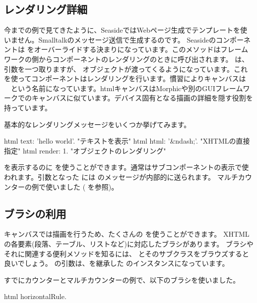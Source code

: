\documentclass[a4paper,10pt,twoside]{book}
\begin{document}
\subsection{レンダリング詳細}

今までの例で見てきたように、SeasideではWebページ生成でテンプレートを使いません。Smalltalkのメッセージ送信で生成するのです。
Seasideのコンポーネントは  をオーバーライドする決まりになっています。このメソッドはフレームワークの側からコンポーネントのレンダリングのときに呼び出されます。
 は、引数を一つ取りますが、  オブジェクトが渡ってくるようになっています。これを使ってコンポーネントはレンダリングを行います。慣習によりキャンバスは 　という名前になっています。htmlキャンバスはMorphicや別のGUIフレームワークでのキャンバスに似ています。デバイス固有となる描画の詳細を隠す役割を持っています。

基本的なレンダリングメッセージをいくつか挙げてみます。
\begin{code}{}
html text: 'hello world'.  "テキストを表示"
html html: '&ndash;'.     "XHTMLの直接指定"
html render: 1.              "オブジェクトのレンダリング"
\end{code}

を表示するのに  を使うことができます。通常はサブコンポーネントの表示で使われます。引数となった には のメッセージが内部的に送られます。
マルチカウンターの例で使いました ( を参照)。

\subsection{ブラシの利用}

キャンバスでは描画を行うため、たくさんの  を使うことができます。
XHTMLの各要素(段落、テーブル、リストなど)に対応したブラシがあります。
ブラシやそれに関連する便利メソッドを知るには、 とそのサブクラスをブラウズすると良いでしょう。
  の引数は、を継承した のインスタンスになっています。

すでにカウンターとマルチカウンターの例で、以下のブラシを使いました。
\begin{code}{}
html horizontalRule.
\end{code}
\end{document}
